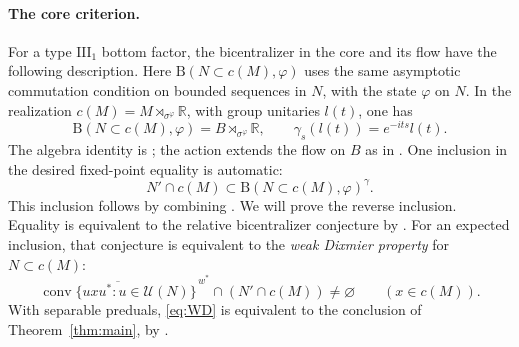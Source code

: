 \documentclass[11pt]{article}
\theoremstyle{definition}
\DeclareMathOperator{\conv}{conv}
\newcommand{\B}{\mathrm B}
\newcommand{\R}{\mathbb R}
\newcommand{\U}{\mathcal U}
\begin{document}
\paragraph{The core criterion.}
For a type $\mathrm{III}_1$ bottom factor, the bicentralizer in the core
and its flow have the following description. Here
$\B(N\subset c(M),\varphi)$ uses the same asymptotic commutation condition
on bounded sequences in $N$, with the state $\varphi$ on $N$.
In the realization
$c(M)=M\rtimes_{\sigma^\varphi}\R$, with group unitaries $l(t)$, one has
\begin{equation}\label{eq:core-bic}
 \B(N\subset c(M),\varphi)=B\rtimes_{\sigma^\varphi}\R,
 \qquad \gamma_s(l(t))=e^{-its}l(t).
\end{equation}
The algebra identity is \cite[Proposition~7.2]{M1}; the action extends the
flow on $B$ as in \cite[Proposition~8.6, proof]{M1}.
One inclusion in the desired fixed-point equality is automatic:
\begin{equation}\label{eq:core-auto}
 N'\cap c(M)\subset\B(N\subset c(M),\varphi)^\gamma.
\end{equation}
This inclusion follows by combining \cite[Proposition~8.1 and its proof,
Theorem~6.20(5), and Proposition~8.4]{M1}. We will prove the reverse
inclusion. Equality is equivalent to the relative bicentralizer
conjecture by \cite[Proposition~8.6]{M1}.
For an expected inclusion, that conjecture is equivalent to the
\emph{weak Dixmier property} for $N\subset c(M)$:
\begin{equation}\label{eq:WD}
 \overline{\conv\{uxu^*:u\in\U(N)\}}^{\,w^*}
 \cap(N'\cap c(M))\ne\varnothing\qquad(x\in c(M)).
\end{equation}
With separable preduals, \eqref{eq:WD} is equivalent to the conclusion of
Theorem~\ref{thm:main}, by \cite[Theorem~D]{M1}.
\end{document}
